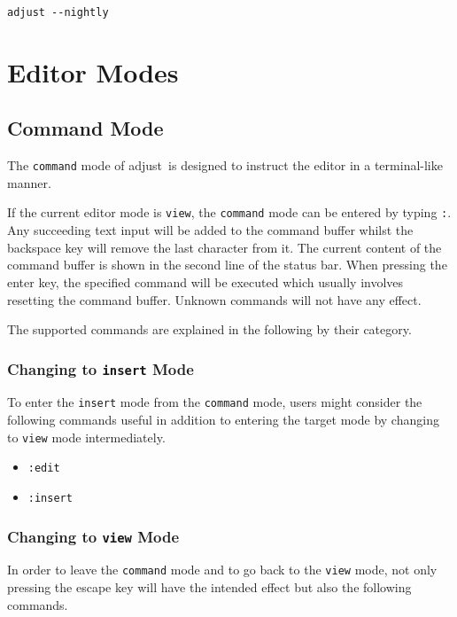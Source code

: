 \documentclass[11pt, a4paper, british]{scrartcl}
\DeclareRobustCommand{\adjust}{\textsf{adjust}}
\begin{document}
\begin{lstlisting}[caption = Updating \adjust, label = lst:update]
adjust --nightly
\end{lstlisting}


\section{Editor Modes}
\label{sec:editor-modes}
\subsection{Command Mode}
\label{sec:command-mode}
The \texttt{command} mode of \adjust\ is designed to instruct the editor in a
terminal-like manner.

If the current editor mode is \texttt{view}, the \texttt{command} mode can be
entered by typing \texttt{:}.  Any succeeding text input will be added to the
command buffer whilst the backspace key will remove the last character from it.
The current content of the command buffer is shown in the second line of the
status bar.  When pressing the enter key, the specified command will be executed
which usually involves resetting the command buffer.  Unknown commands will not
have any effect.

The supported commands are explained in the following by their category.

\subsubsection{Changing to \texttt{insert} Mode}
\label{sec:changing-to-insert-mode}
To enter the \texttt{insert} mode from the \texttt{command} mode, users might
consider the following commands useful in addition to entering the target mode
by changing to \texttt{view} mode intermediately.

\begin{itemize}
\item \texttt{:edit}
\item \texttt{:insert}
\end{itemize}

\subsubsection{Changing to \texttt{view} Mode}
\label{sec:changing-to-view-mode}
In order to leave the \texttt{command} mode and to go back to the \texttt{view}
mode, not only pressing the escape key will have the intended effect but also
the following commands.
\end{document}
